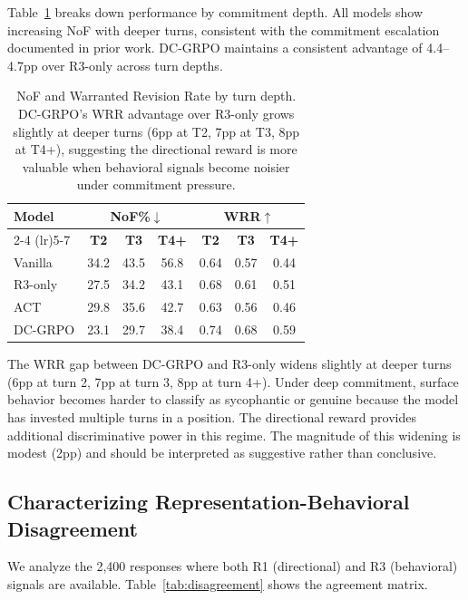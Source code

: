\documentclass[11pt,a4paper]{article}
\begin{document}
Table~\ref{tab:turndepth} breaks down performance by commitment depth. All models show increasing NoF with deeper turns, consistent with the commitment escalation documented in prior work. DC-GRPO maintains a consistent advantage of 4.4--4.7pp over R3-only across turn depths.

\begin{table}[t]
\centering
\small
\begin{tabular}{lcccccc}
\toprule
\multirow{2}{*}{\textbf{Model}} & \multicolumn{3}{c}{\textbf{NoF\%}$\downarrow$} & \multicolumn{3}{c}{\textbf{WRR}$\uparrow$} \\
\cmidrule(lr){2-4} \cmidrule(lr){5-7}
 & \textbf{T2} & \textbf{T3} & \textbf{T4+} & \textbf{T2} & \textbf{T3} & \textbf{T4+} \\
\midrule
Vanilla  & 34.2 & 43.5 & 56.8 & 0.64 & 0.57 & 0.44 \\
R3-only  & 27.5 & 34.2 & 43.1 & 0.68 & 0.61 & 0.51 \\
ACT      & 29.8 & 35.6 & 42.7 & 0.63 & 0.56 & 0.46 \\
DC-GRPO  & 23.1 & 29.7 & 38.4 & 0.74 & 0.68 & 0.59 \\
\bottomrule
\end{tabular}
\caption{NoF and Warranted Revision Rate by turn depth. DC-GRPO's WRR advantage over R3-only grows slightly at deeper turns (6pp at T2, 7pp at T3, 8pp at T4+), suggesting the directional reward is more valuable when behavioral signals become noisier under commitment pressure.}
\label{tab:turndepth}
\end{table}

The WRR gap between DC-GRPO and R3-only widens slightly at deeper turns (6pp at turn 2, 7pp at turn 3, 8pp at turn 4+). Under deep commitment, surface behavior becomes harder to classify as sycophantic or genuine because the model has invested multiple turns in a position. The directional reward provides additional discriminative power in this regime. The magnitude of this widening is modest (2pp) and should be interpreted as suggestive rather than conclusive.

\subsection{Characterizing Representation-Behavioral Disagreement}
\label{sec:disagreement}

We analyze the 2,400 responses where both R1 (directional) and R3 (behavioral) signals are available. Table~\ref{tab:disagreement} shows the agreement matrix.
\end{document}
